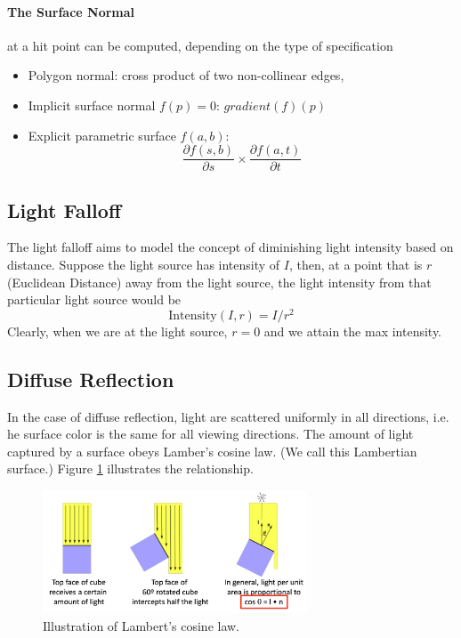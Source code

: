 \documentclass[11pt]{article}
\begin{document}
\paragraph{The Surface Normal} at a hit point can be computed, depending on the type of specification
\begin{itemize}
	\item Polygon normal: cross product of two non-collinear edges, 
	\item Implicit surface normal $f(p) = 0$: $gradient(f)(p)$
	\item Explicit parametric surface $f(a,b)$: 
	\begin{equation}
		\frac{\partial f(s, b)}{\partial s} \times \frac{\partial f(a, t)}{\partial t}
	\end{equation}
\end{itemize}

\subsection{Light Falloff}
The light falloff aims to model the concept of diminishing light intensity based on distance. Suppose the light source has intensity of $I$, then, at a point that is $r$ (Euclidean Distance) away from the light source, the light intensity from that particular light source would be
\begin{equation}
	\text{Intensity}(I, r) = I / r^2
\end{equation}
Clearly, when we are at the light source, $r = 0$ and we attain the max intensity. 

\subsection{Diffuse Reflection}
In the case of diffuse reflection, light are scattered uniformly in all directions, i.e. he surface color is the same for all viewing directions. The amount of light captured by a surface obeys Lamber's cosine law. (We call this Lambertian surface.) Figure \ref{lambert} illustrates the relationship. 

\begin{figure}
	\centering \includegraphics[width=0.7\textwidth]{figs/lambert}
	\caption{\label{lambert} Illustration of Lambert's cosine law. }
\end{figure}
\end{document}
